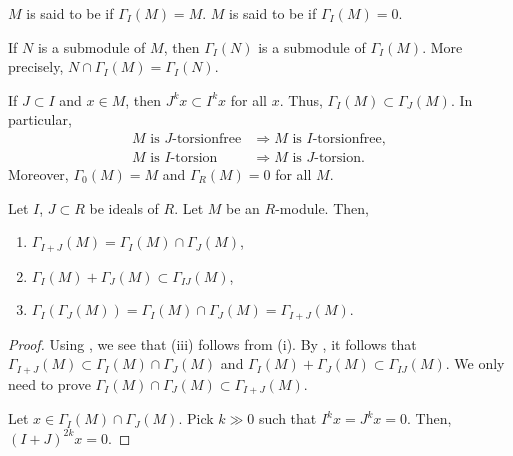 \begin{defn}
	$M$ is said to be  if $\Gamma_{I}(M) = M$. \newline
	$M$ is said to be  if $\Gamma_{I}(M) = 0$.
\end{defn}

\begin{obs} \label{obs:Gamma-submodule-intersection}
	If $N$ is a submodule of $M$, then $\Gamma_{I}(N)$ is a submodule of $\Gamma_{I}(M)$. More precisely, $N \cap \Gamma_{I}(M) = \Gamma_{I}(N)$.
\end{obs}

\begin{obs} \label{obs:gamma-inclusion-reversing-on-ideals}
	If $J \subset I$ and $x \in M$, then $J^{k} x \subset I^{k} x$ for all $x$. Thus, $\Gamma_{I}(M) \subset \Gamma_{J}(M)$. In particular,
	\begin{align*} 
		\text{$M$ is $J$-torsionfree} &\Rightarrow \text{$M$ is $I$-torsionfree}, \\
		\text{$M$ is $I$-torsion} &\Rightarrow \text{$M$ is $J$-torsion.}
	\end{align*}
	Moreover, $\Gamma_{0}(M) = M$ and $\Gamma_{R}(M) = 0$ for all $M$.
\end{obs}

\begin{prop} \label{prop:product-sum-local-cohomology}
	Let $I$, $J \subset R$ be ideals of $R$. Let $M$ be an $R$-module. Then,
	\begin{enumerate}[label=(\roman*)]
		\item $\Gamma_{I + J}(M) = \Gamma_{I}(M) \cap \Gamma_{J}(M)$,
		\item $\Gamma_{I}(M) + \Gamma_{J}(M) \subset \Gamma_{IJ}(M)$,
		\item $\Gamma_{I}(\Gamma_{J}(M)) = \Gamma_{I}(M) \cap \Gamma_{J}(M) = \Gamma_{I + J}(M)$.
	\end{enumerate}
\end{prop}
\begin{proof} 
	Using , we see that (iii) follows from (i). By , it follows that $\Gamma_{I + J}(M) \subset \Gamma_{I}(M) \cap \Gamma_{J}(M)$ and $\Gamma_{I}(M) + \Gamma_{J}(M) \subset \Gamma_{IJ}(M)$. We only need to prove $\Gamma_{I}(M) \cap \Gamma_{J}(M) \subset \Gamma_{I + J}(M)$. 

	Let $x \in \Gamma_{I}(M) \cap \Gamma_{J}(M)$. Pick $k \gg 0$ such that $I^{k}x = J^{k}x = 0$. Then, $(I + J)^{2k} x = 0$.
\end{proof}

